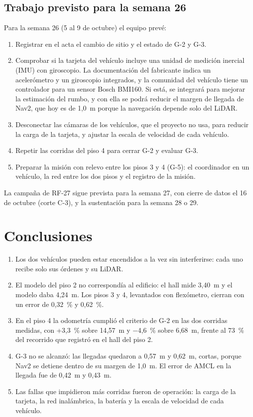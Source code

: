 \documentclass[12pt,letterpaper]{article}
\begin{document}
\subsection{Trabajo previsto para la semana 26}

Para la semana 26 (5 al 9 de octubre) el equipo prevé:

\begin{enumerate}[leftmargin=*]
    \item Registrar en el acta el cambio de sitio y el estado de G-2 y G-3.
    \item Comprobar si la tarjeta del vehículo incluye una unidad de medición inercial (IMU) con giroscopio. La documentación del fabricante indica un acelerómetro y un giroscopio integrados, y la comunidad del vehículo tiene un controlador para un sensor Bosch BMI160. Si está, se integrará para mejorar la estimación del rumbo, y con ella se podrá reducir el margen de llegada de Nav2, que hoy es de 1,0~m porque la navegación depende solo del LiDAR.
    \item Desconectar las cámaras de los vehículos, que el proyecto no usa, para reducir la carga de la tarjeta, y ajustar la escala de velocidad de cada vehículo.
    \item Repetir las corridas del piso 4 para cerrar G-2 y evaluar G-3.
    \item Preparar la misión con relevo entre los pisos 3 y 4 (G-5): el coordinador en un vehículo, la red entre los dos pisos y el registro de la misión.
\end{enumerate}

La campaña de RF-27 sigue prevista para la semana 27, con cierre de datos el 16 de octubre (corte C-3), y la sustentación para la semana 28 o 29.

\section{Conclusiones}

\begin{enumerate}[leftmargin=*]
    \item Los dos vehículos pueden estar encendidos a la vez sin interferirse: cada uno recibe solo sus órdenes y su LiDAR.
    \item El modelo del piso 2 no correspondía al edificio: el hall mide 3,40~m y el modelo daba 4,24~m. Los pisos 3 y 4, levantados con flexómetro, cierran con un error de 0,32~\% y 0,62~\%.
    \item En el piso 4 la odometría cumplió el criterio de G-2 en las dos corridas medidas, con +3,3~\% sobre 14,57~m y $-$4,6~\% sobre 6,68~m, frente al 73~\% del recorrido que registró en el hall del piso 2.
    \item G-3 no se alcanzó: las llegadas quedaron a 0,57~m y 0,62~m, cortas, porque Nav2 se detiene dentro de su margen de 1,0~m. El error de AMCL en la llegada fue de 0,42~m y 0,43~m.
    \item Las fallas que impidieron más corridas fueron de operación: la carga de la tarjeta, la red inalámbrica, la batería y la escala de velocidad de cada vehículo.
\end{enumerate}
\end{document}
